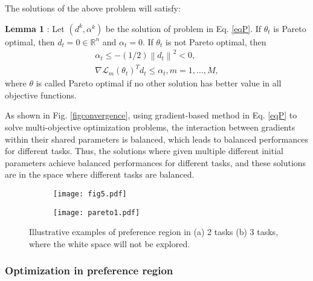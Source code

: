 \documentclass[final]{cvpr}
\begin{document}
The solutions of the above problem will satisfy:

\textbf{Lemma 1} \cite{fliege2000steepest}: Let $\left(d^{k}, \alpha^{k}\right)$ be the solution of problem in Eq. \ref{eqP}.
If $\theta_{t}$ is Pareto optimal, then $d_{t}=0 \in \mathbb{R}^{n}$ and $\alpha_{t}=0$. If $\theta_{t}$ is not Pareto optimal, then
\begin{equation}
	\begin{array}{c}\alpha_{t} \leq-(1 / 2)\left\|d_{t}\right\|^{2}<0, \\ \nabla \mathcal{L}_{m}\left(\theta_{t}\right)^{T} d_{t} \leq \alpha_{t}, m=1, \ldots, M, \end{array}
\end{equation}
where $\theta$ is called Pareto optimal if no other solution has better value in all objective functions.  
 
As shown in Fig. \ref{figconvergence},
 using gradient-based method in Eq. \ref{eqP} to solve multi-objective optimization problems, the interaction between gradients within their shared parameters is balanced, which leads to balanced performances for different tasks. Thus, the solutions where given multiple different initial parameters achieve balanced performances for different tasks, and these solutions are in the space where different tasks are balanced. 
 

\begin{figure}
	\centering
	\begin{subfigure}{0.46\linewidth}
		\texttt{[image: fig5.pdf]}\label{common}
		\caption{}
	\end{subfigure}
	\begin{subfigure}{0.46\linewidth}
		\texttt{[image: pareto1.pdf]}\label{private}
		\caption{ }
	\end{subfigure}
	\caption{Illustrative examples of preference region in (a) 2 tasks (b) 3 tasks, where the white space will not be explored.}\label{figpre}
\end{figure}


\subsubsection{Optimization in preference region}\label{secRegion}
\end{document}
